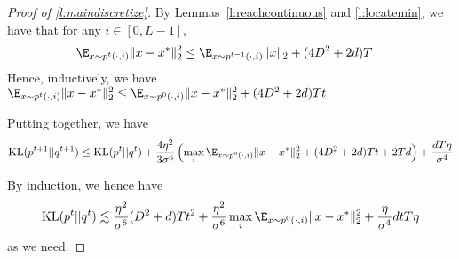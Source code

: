 \begin{proof}[Proof of \ref{l:maindiscretize}]
By Lemmas~\ref{l:reachcontinuous} and \ref{l:locatemin}, we have that for any $i \in [0, L-1]$, 
\begin{align*} \E_{x \sim p^t( \cdot, i)}\|x - x^*\|_2^2 &\leq  \E_{x \sim p^{t-1}( \cdot, i)}\|x\|_2 + (4 D^2 + 2d) T \end{align*} 
Hence, inductively, we have $\E_{x \sim p^t( \cdot, i)}\|x - x^*\|_2^2 \leq \E_{x \sim p^0( \cdot, i)}\|x - x^*\|_2^2 +  (4 D^2+2d) T t$

Putting together, we have 
\begin{align*} \mbox{KL} (p^{t+1} || q^{t+1}) \leq \mbox{KL}(p^t || q^t) + \frac{4 \eta^2}{3 \sigma^6} \left( \max_i \E_{x \sim p^0( \cdot, i)}\|x - x^*\|_2^2 + (4 D^2 + 2d) T t + 2 Td \right) + \frac{d T \eta}{\sigma^4} \end{align*}

By induction, we hence have 
\begin{align*} \mbox{KL} (p^t || q^t) \lesssim \frac{\eta^2}{\sigma^6} (D^2+d) T t^2 + \frac{\eta^2}{\sigma^6} \max_i \E_{x \sim p^0( \cdot, i)}\|x - x^*\|_2^2 + \frac{\eta}{\sigma^4} d t T \eta  \end{align*}
as we need. 
\end{proof} 

